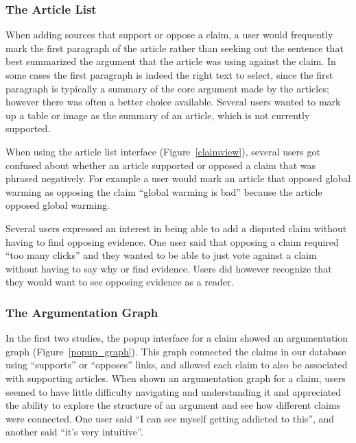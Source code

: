 \documentclass{www2010-submission}
\begin{document}
\subsubsection{The Article List}

When adding sources that support or oppose a claim, a user would frequently mark the first paragraph of the article rather than seeking out the sentence that best summarized the argument that the article was using against the claim. In some cases the first paragraph is indeed the right text to select, since the first paragraph is typically a summary of the core argument made by the articles; however there was often a better choice available. Several users wanted to mark up a table or image as the summary of an article, which is not currently supported.

When using the article list interface (Figure~\ref{claimview}), several users got confused about whether an article supported or opposed a claim that was phrased negatively. For example a user would mark an article that opposed global warming as opposing the claim ``global warming is bad'' because the article opposed global warming.

Several users expressed an interest in being able to add a disputed claim without having to find opposing evidence. One user said that opposing a claim required ``too many clicks'' and they wanted to be able to just vote against a claim without having to say why or find evidence. Users did however recognize that they would want to see opposing evidence as a reader.

\subsubsection{The Argumentation Graph}

In the first two studies, the popup interface for a claim showed an argumentation graph (Figure~\ref{popup_graph}). This graph connected the claims in our database using ``supports'' or ``opposes'' links, and allowed each claim to also be associated with supporting articles. When shown an argumentation graph for a claim, users seemed to have little difficulty navigating and understanding it and appreciated the ability to explore the structure of an argument and see how different claims were connected. One user said ``I can see myself getting addicted to this'', and another said ``it's very intuitive''.
\end{document}
